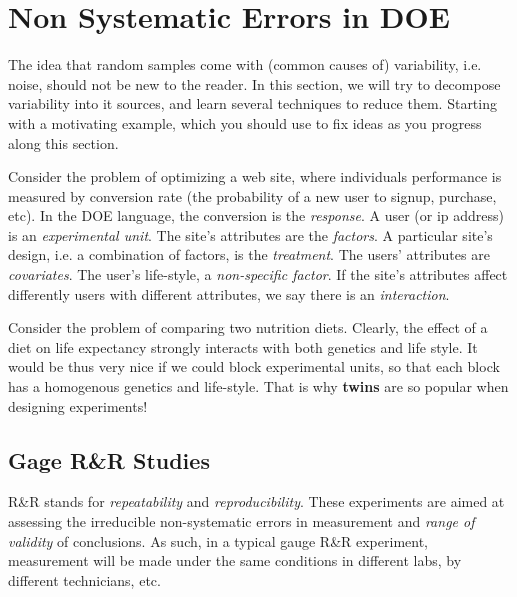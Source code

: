\section{Non Systematic Errors in DOE}
\label{sec:variance_components}


The idea that random samples come with (common causes of) variability, i.e. noise, should not be new to the reader.
In this section, we will try to decompose variability into it sources, and learn several techniques to reduce them. 
Starting with a motivating example, which you should use to fix ideas as you progress along this section. 



\begin{example}
\label{eg:web_design}
Consider the problem of optimizing a web site, where individuals performance is measured by conversion rate (the probability of a new user to signup, purchase, etc).
In the DOE language, the conversion is the \emph{response}.
A user (or ip address) is an \emph{experimental unit}.
The site's attributes are the \emph{factors}.
A particular site's design, i.e. a combination of factors, is the \emph{treatment}.
The users' attributes are \emph{covariates}. 
The user's life-style, a \emph{non-specific factor}.
If the site's attributes affect differently users with different attributes, we say there is an \emph{interaction}.
\end{example}




\begin{example}
\label{eg:diets}
Consider the problem of comparing two nutrition diets. 
Clearly, the effect of a diet on life expectancy strongly interacts with both genetics and life style. 
It would be thus very nice if we could block experimental units, so that each block has a homogenous genetics and life-style. 
That is why \textbf{twins} are so popular when designing experiments!
\end{example}







\subsection{Gage R\&R Studies}
R\&R stands for \emph{repeatability} and \emph{reproducibility}.
These experiments are aimed at assessing the irreducible non-systematic errors in measurement and \emph{range of validity} of conclusions.
As such, in a typical gauge R\&R experiment, measurement will be made under the same conditions in different labs, by different technicians, etc. 






